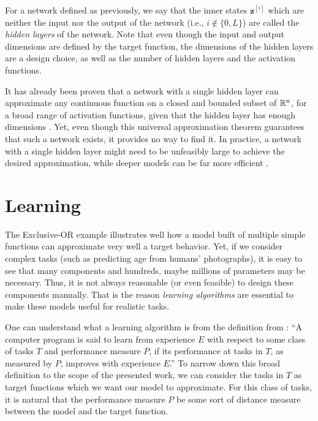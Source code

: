 For a network defined as previously, we say that the inner states $\bm{z}^{[i]}$ which are neither the input nor the output of the network (i.e., $i\not\in \{0,L\}$) are called the \textit{hidden layers} of the network.
Note that even though the input and output dimensions are defined by the target function, the dimensions of the hidden layers are a design choice, as well as the number of hidden layers and the activation functions.

It has already been proven that a network with a single hidden layer can approximate any continuous function on a closed and bounded subset of $\mathbb{R}^n$, for a broad range of activation functions, given that the hidden layer has enough dimensions \cite{hornik_multilayer_1989,leshno_multilayer_1993}.
Yet, even though this universal approximation theorem guarantees that such a network exists, it provides no way to find it.
In practice, a network with a single hidden layer might need to be unfeasibly large to achieve the desired approximation, while deeper models can be far more efficient \cite{goodfellow_deep_2016}.

\section{Learning}

The Exclusive-OR example illustrates well how a model built of multiple simple functions can approximate very well a target behavior.
Yet, if we consider complex tasks (such as predicting age from humans' photographs), it is easy to see that many components and hundreds, maybe millions of parameters may be necessary\footnotemark.
Thus, it is not always reasonable (or even feasible) to design these components manually.
That is the reason \textit{learning algorithms} are essential to make these models useful for realistic tasks.


One can understand what a learning algorithm is from the definition from \textcite{mitchell_machine_1997}:
``A computer program is said to learn from experience $E$ with respect to some class of tasks $T$ and performance measure $P$, if its performance at tasks in $T$, as measured by $P$, improves with experience $E$.''
To narrow down this broad definition to the scope of the presented work, we can consider the tasks in $T$ as target functions which we want our model to approximate.
For this class of tasks, it is natural that the performance measure $P$ be some sort of distance measure between the model and the target function.

